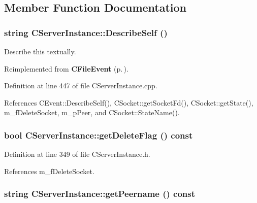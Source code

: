 \subsection{Member Function Documentation}
\subsubsection{\setlength{\rightskip}{0pt plus 5cm}string CServer\-Instance::Describe\-Self ()\hspace{0.3cm}{\tt  [virtual]}}\label{classCServerInstance_a11}


Describe this textually. 

Reimplemented from {\bf CFile\-Event} {\rm (p.\,\pageref{classCFileEvent_a19})}.

Definition at line 447 of file CServer\-Instance.cpp.

References CEvent::Describe\-Self(), CSocket::get\-Socket\-Fd(), CSocket::get\-State(), m\_\-f\-Delete\-Socket, m\_\-p\-Peer, and CSocket::State\-Name().
\subsubsection{\setlength{\rightskip}{0pt plus 5cm}bool CServer\-Instance::get\-Delete\-Flag () const\hspace{0.3cm}{\tt  [inline]}}\label{classCServerInstance_a5}




Definition at line 349 of file CServer\-Instance.h.

References m\_\-f\-Delete\-Socket.
\subsubsection{\setlength{\rightskip}{0pt plus 5cm}string CServer\-Instance::get\-Peername () const}\label{classCServerInstance_a6}


